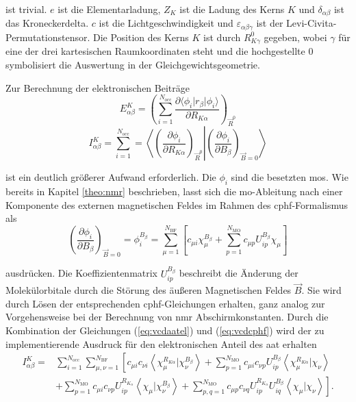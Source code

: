 	ist trivial. $e$ ist die Elementarladung, $Z_K$ ist die Ladung des Kerns $K$ und $\delta_{\alpha\beta}$ ist das Kroneckerdelta. $c$ ist die Lichtgeschwindigkeit und $\varepsilon_{\alpha\beta\gamma}$ ist der Levi-Civita-Permutationstensor. Die Position des Kerns $K$ ist durch $R^0_{K\gamma}$ gegeben, wobei $\gamma$ für eine der drei kartesischen Raumkoordinaten steht und die hochgestellte $0$ symbolisiert die Auswertung in der Gleichgewichtsgeometrie.   
	
    Zur Berechnung der elektronischen Beiträge 
    \begin{equation}
      E^K_{\alpha\beta}=\left(\sum_{i=1}^{N_{\text{occ}}}\frac{\partial \langle\phi_i\vert r_\beta\vert\phi_i\rangle}{\partial R_{K\alpha}}\right)_{\vec{R}^0}
    \end{equation}
    \begin{equation}\label{eq:vcdaatel}
      I^K_{\alpha\beta}=\sum_{i=1}^{N_{\text{occ}}}=\left\langle\left.\left(\frac{\partial \phi_i}{\partial R_{K\alpha}}\right)_{\vec{R}^0}\right|\left(\frac{\partial \phi_i}{\partial B_\beta}\right)_{\vec{B}=0}\right\rangle
    \end{equation}
    
    ist ein deutlich größerer Aufwand erforderlich. Die $\phi_i$ sind die besetzten \acp{mo}. Wie bereits in Kapitel \ref{theo:nmr} beschrieben, lasst sich die \ac{mo}-Ableitung nach einer Komponente des externen magnetischen Feldes im Rahmen des \ac{cphf}-Formalismus als 
    \begin{equation}\label{eq:vcdcphf}
    \left(\frac{\partial \phi_i}{\partial B_\beta}\right)_{\vec{B}=0}=\phi_i^{B_\beta}=\sum_{\mu=1}^{N_{\text{BF}}}\left[c_{\mu i}\chi_\mu^{B_\beta}+\sum_{p=1}^{N_{\text{MO}}}c_{\mu p}U_{ip}^{B_\beta}\chi_\mu\right]
	\end{equation}
	
	ausdrücken. Die Koeffizientenmatrix $U_{ip}^{B_\beta}$ beschreibt die Änderung der Molekülorbitale durch die Störung des äußeren Magnetischen Feldes $\vec{B}$. Sie wird durch Lösen der entsprechenden \ac{cphf}-Gleichungen erhalten, ganz analog zur Vorgehensweise bei der Berechnung von \ac{nmr} Abschirmkonstanten. Durch die Kombination der Gleichungen (\ref{eq:vcdaatel}) und  (\ref{eq:vcdcphf}) wird der zu implementierende Ausdruck für den elektronischen Anteil des \ac{aat} erhalten
	\begin{equation}\label{eq:vcdaatelfinal}
	\begin{aligned}
	I^K_{\alpha\beta}=&\sum_{i=1}^{N_{\text{occ}}}\sum_{\mu,\nu=1}^{N_{\text{BF}}}\left[c_{\mu i}c_{\nu i}\left\langle\chi_\mu^{R_{K\alpha}}\vert\chi_\nu^{B_\beta}\right\rangle+\sum_{p=1}^{N_{\text{MO}}}c_{\mu i}c_{\nu p}U_{ip}^{B_\beta}\left\langle\chi_\mu^{R_{K\alpha}}\vert\chi_\nu\right\rangle\right.\\
	&\left.+\sum_{p=1}^{N_{\text{MO}}}c_{\mu i}c_{\nu p}U_{ip}^{R_{K_\alpha}}\left\langle\chi_\mu\vert\chi_\nu^{B_{\beta}}\right\rangle+\sum_{p,q=1}^{N_{\text{MO}}}c_{\mu p}c_{\nu q}U_{ip}^{R_{K_\alpha}}U_{iq}^{B_\beta}\left\langle\chi_\mu\vert\chi_\nu\right\rangle\right].
	\end{aligned}
	\end{equation}
	
